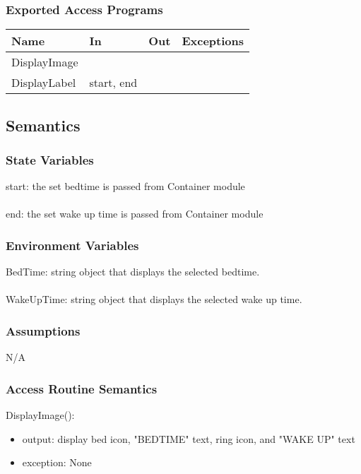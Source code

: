 \documentclass[12pt, titlepage]{article}
\begin{document}
\subsubsection{Exported Access Programs}

\begin{tabular}{| l | l | l | l |}
	\hline
	{\textbf{Name}} & {\textbf{In}} & {\textbf{Out}} & {\textbf{Exceptions}}\\
	\hline
	{DisplayImage} & & & \\
	\hline
	{DisplayLabel} & start, end & & \\
	\hline
\end{tabular}

\subsection{Semantics}

\subsubsection{State Variables}
start: the set bedtime is passed from Container module\\\\
end: the set wake up time is passed from Container module

\subsubsection{Environment Variables}
BedTime: string object that displays the selected bedtime.\\\\
WakeUpTime: string object that displays the selected wake up time.

\subsubsection{Assumptions}
N/A

\subsubsection{Access Routine Semantics}

\noindent DisplayImage():
\begin{itemize}
	\item output: display bed icon, "BEDTIME" text, ring icon, and "WAKE UP" text
	\item exception: None
\end{itemize}
\end{document}
